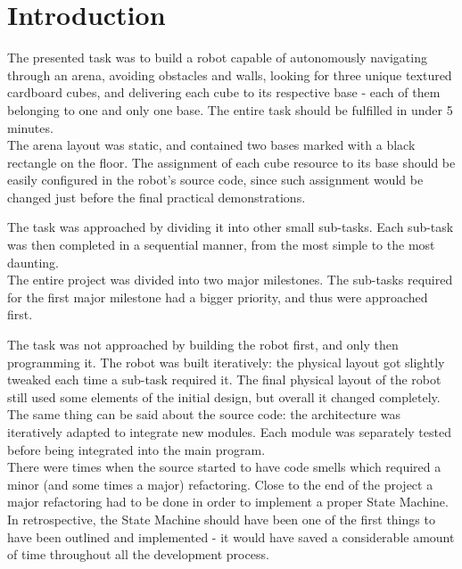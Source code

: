\section{Introduction}

The presented task was to build a robot capable of autonomously navigating through an arena, avoiding obstacles and walls, looking for three unique textured cardboard cubes, and delivering each cube to its respective base - each of them belonging to one and only one base. The entire task should be fulfilled in under 5 minutes.\\
The arena layout was static, and contained two bases marked with a black rectangle on the floor. The assignment of each cube resource to its base should be easily configured in the robot's source code, since such assignment would be changed just before the final practical demonstrations.

The task was approached by dividing it into other small sub-tasks. Each sub-task was then completed in a sequential manner, from the most simple to the most daunting.\\
The entire project was divided into two major milestones. The sub-tasks required for the first major milestone had a bigger priority, and thus were approached first.

The task was not approached by building the robot first, and only then programming it. The robot was built iteratively: the physical layout got slightly tweaked each time a sub-task required it. The final physical layout of the robot still used some elements of the initial design, but overall it changed completely.\\
The same thing can be said about the source code: the architecture was iteratively adapted to integrate new modules. Each module was separately tested before being integrated into the main program.\\
There were times when the source started to have code smells which required a minor (and some times a major) refactoring. Close to the end of the project a major refactoring had to be done in order to implement a proper State Machine. In retrospective, the State Machine should have been one of the first things to have been outlined and implemented - it would have saved a considerable amount of time throughout all the development process.

\newpage
